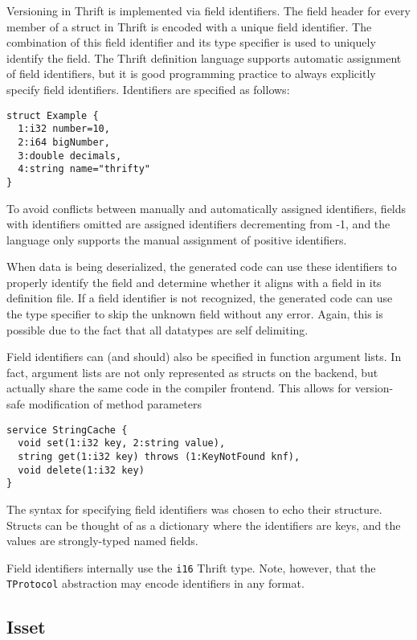 \documentclass[nocopyrightspace,blockstyle]{sigplanconf}
\begin{document}
Versioning in Thrift is implemented via field identifiers. The field header
for every member of a struct in Thrift is encoded with a unique field
identifier. The combination of this field identifier and its type specifier
is used to uniquely identify the field. The Thrift definition language
supports automatic assignment of field identifiers, but it is good
programming practice to always explicitly specify field identifiers.
Identifiers are specified as follows:

\begin{verbatim}
struct Example {
  1:i32 number=10,
  2:i64 bigNumber,
  3:double decimals,
  4:string name="thrifty"
}\end{verbatim}

To avoid conflicts between manually and automatically assigned identifiers,
fields with identifiers omitted are assigned identifiers
decrementing from -1, and the language only supports the manual assignment of
positive identifiers.

When data is being deserialized, the generated code can use these identifiers
to properly identify the field and determine whether it aligns with a field in
its definition file. If a field identifier is not recognized, the generated
code can use the type specifier to skip the unknown field without any error.
Again, this is possible due to the fact that all datatypes are self
delimiting.

Field identifiers can (and should) also be specified in function argument
lists. In fact, argument lists are not only represented as structs on the
backend, but actually share the same code in the compiler frontend. This
allows for version-safe modification of method parameters

\begin{verbatim}
service StringCache {
  void set(1:i32 key, 2:string value),
  string get(1:i32 key) throws (1:KeyNotFound knf),
  void delete(1:i32 key)
}
\end{verbatim}

The syntax for specifying field identifiers was chosen to echo their structure.
Structs can be thought of as a dictionary where the identifiers are keys, and
the values are strongly-typed named fields.

Field identifiers internally use the \texttt{i16} Thrift type. Note, however,
that the \texttt{TProtocol} abstraction may encode identifiers in any format.

\subsection{Isset}
\end{document}
